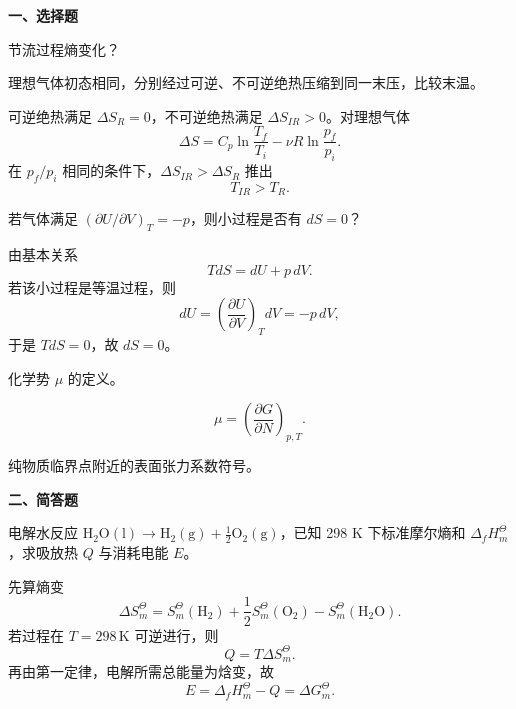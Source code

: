 ﻿

\textbf{一、选择题}
\begin{question}
节流过程熵变化？
\begin{solution}

\end{solution}
\end{question}

\begin{question}
理想气体初态相同，分别经过可逆、不可逆绝热压缩到同一末压，比较末温。
\begin{solution}
可逆绝热满足 $\Delta S_R=0$，不可逆绝热满足 $\Delta S_{IR}>0$。对理想气体
\[
\Delta S=C_p\ln\frac{T_f}{T_i}-\nu R\ln\frac{p_f}{p_i}.
\]
在 $p_f/p_i$ 相同的条件下，$\Delta S_{IR}>\Delta S_R$ 推出
\[
T_{IR}>T_R.
\]
\end{solution}
\end{question}

\begin{question}
若气体满足 $\left(\partial U/\partial V\right)_T=-p$，则小过程是否有 $dS=0$？
\begin{solution}
由基本关系
\[
TdS=dU+p\,dV.
\]
若该小过程是等温过程，则
\[
dU=\left(\frac{\partial U}{\partial V}\right)_T dV=-p\,dV,
\]
于是 $TdS=0$，故 $dS=0$。
\end{solution}
\end{question}

\begin{question}
化学势 $\mu$ 的定义。
\begin{solution}
\[
\mu=\left(\frac{\partial G}{\partial N}\right)_{p,T}.
\]
\end{solution}
\end{question}

\begin{question}
纯物质临界点附近的表面张力系数符号。
\begin{solution}

\end{solution}
\end{question}

\textbf{二、简答题}
\begin{question}
电解水反应 $\mathrm{H_2O(l)}\to \mathrm{H_2(g)}+\tfrac12\mathrm{O_2(g)}$，已知 298 K 下标准摩尔熵和 $\Delta_f H_m^\Theta$，求吸放热 $Q$ 与消耗电能 $E$。
\begin{solution}
先算熵变
\[
\Delta S_m^\Theta=S_m^\Theta(\mathrm{H_2})+\frac12S_m^\Theta(\mathrm{O_2})-S_m^\Theta(\mathrm{H_2O}).
\]
若过程在 $T=298\,\mathrm K$ 可逆进行，则
\[
Q=T\Delta S_m^\Theta.
\]
再由第一定律，电解所需总能量为焓变，故
\[
E=\Delta_f H_m^\Theta-Q=\Delta G_m^\Theta.
\]
\end{solution}
\end{question}

